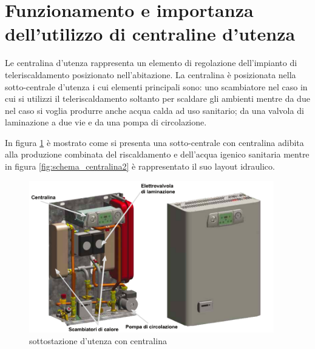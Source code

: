 \documentclass[laurea,oneside,11pt]{USiena_tesiLM}
\begin{document}
\section{Funzionamento e importanza dell'utilizzo di centraline d'utenza}
\label{sec:centraline}
Le centralina d'utenza rappresenta un elemento di regolazione dell'impianto di teleriscaldamento posizionato nell'abitazione. La centralina è posizionata nella sotto-centrale d'utenza i cui elementi principali sono: uno scambiatore nel caso in cui si utilizzi il teleriscaldamento soltanto per scaldare gli ambienti mentre da due nel caso si voglia produrre anche acqua calda ad uso sanitario; da una valvola di laminazione a due vie e da una pompa di circolazione. 

In figura \ref{fig:centralina} è mostrato come si presenta una sotto-centrale con centralina adibita alla produzione combinata del riscaldamento e dell'acqua igenico sanitaria mentre in figura \ref{fig:schema_centralina2} è rappresentato il suo layout idraulico.

\begin{figure}[!ht]
\centering
\includegraphics[width=0.95\textwidth]{figure/centralina} 
\caption{sottostazione d'utenza con centralina}
\label{fig:centralina}
\end{figure}
\end{document}
